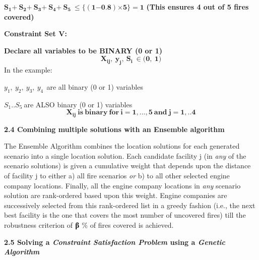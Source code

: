 \documentclass{article} %
\begin{document}
\noindent ${\boldsymbol{S}}_{\boldsymbol{1}}\boldsymbol{+\ }{\boldsymbol{S}}_{\boldsymbol{2}}\boldsymbol{+\ }{\boldsymbol{S}}_{\boldsymbol{3}}\boldsymbol{+\ }{\boldsymbol{S}}_{\boldsymbol{4}}\boldsymbol{+\ }{\boldsymbol{S}}_{\boldsymbol{5}}\boldsymbol{\ }\boldsymbol{\le }\boldsymbol{\{}\left(\boldsymbol{1}\boldsymbol{-}\boldsymbol{0}.\boldsymbol{8}\right)\boldsymbol{\times }\boldsymbol{5}\}\boldsymbol{=}\boldsymbol{1}$\textbf{ (This ensures 4 out of 5 fires covered)}

\noindent 

\noindent \textbf{Constraint Set V:}

\noindent \textbf{Declare all variables to be BINARY (0 or 1)}
\[{\boldsymbol{X}}_{\boldsymbol{ij}}\boldsymbol{,\ }{\boldsymbol{y}}_{\boldsymbol{j}}\boldsymbol{,\ }{\boldsymbol{S}}_{\boldsymbol{i}}\boldsymbol{\ }\boldsymbol{\in }\boldsymbol{(}\boldsymbol{0}\boldsymbol{,\ }\boldsymbol{1}\boldsymbol{)}\] 
In the example:

\noindent $y_1,\ y_2,\ y_3,\ y_4\ \ $are all binary (0 or 1) variables

\noindent $S_1..S_5\ $are ALSO binary (0 or 1) variables
\[{\boldsymbol{X}}_{\boldsymbol{ij}}\boldsymbol{\ }\boldsymbol{is}\boldsymbol{\ }\boldsymbol{binary}\boldsymbol{\ }\boldsymbol{for}\boldsymbol{\ }\boldsymbol{i}\boldsymbol{=}\boldsymbol{1}\boldsymbol{,\dots ,}\boldsymbol{5}\boldsymbol{\ }\boldsymbol{and}\boldsymbol{\ }\boldsymbol{j}\boldsymbol{=}\boldsymbol{1},..\boldsymbol{4}\] 
\textbf{\eject }

\noindent \textbf{2.4 Combining multiple solutions with an Ensemble algorithm}

\noindent The Ensemble Algorithm combines the location solutions for each generated scenario into a single location solution.  Each candidate facility j (in \textit{any} of the scenario solutions) is given a cumulative weight that depends upon the distance of facility j to either a) all fire scenarios \textit{or} b) to all other selected engine company locations.  Finally, all the engine company locations in \textit{any }scenario solution are rank-ordered based upon this weight.  Engine companies are successively selected from this rank-ordered list in a greedy fashion (i.e., the next best facility is the one that covers the most number of uncovered fires) till the robustness criterion of \textbf{$\boldsymbol{\betaup}$} \% of fires covered is achieved.

\noindent 

\noindent \textbf{2.5 Solving a \textit{Constraint Satisfaction Problem} using a \textit{Genetic Algorithm}}
\end{document}
